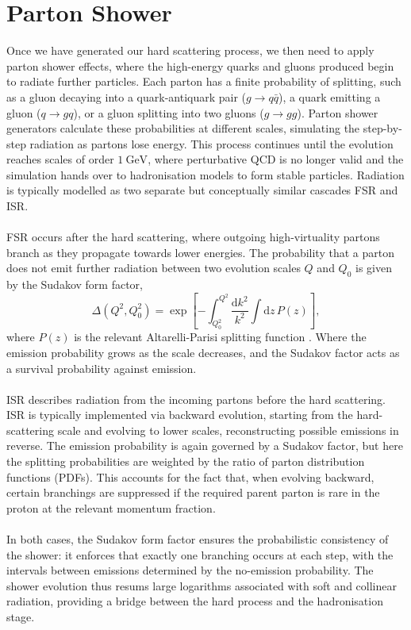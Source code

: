 \section{Parton Shower} \label{PS}
Once we have generated our hard scattering process, we then need to apply parton shower effects, where the high-energy quarks and gluons produced begin to radiate further particles. Each parton has a finite probability of splitting, such as a gluon decaying into a quark-antiquark pair ($g \to q\bar{q}$), a quark emitting a gluon ($q \to gq$), or a gluon splitting into two gluons ($g \to gg$). Parton shower generators calculate these probabilities at different scales, simulating the step-by-step radiation as partons lose energy. This process continues until the evolution reaches scales of order $1~\text{GeV}$, where perturbative QCD is no longer valid and the simulation hands over to hadronisation models to form stable particles. Radiation is typically modelled as two separate but conceptually similar cascades FSR and ISR.\\
\\
FSR occurs after the hard scattering, where outgoing high-virtuality partons branch as they propagate towards lower energies. The probability that a parton does not emit further radiation between two evolution scales $Q$ and $Q_0$ is given by the Sudakov form factor,
    \begin{equation}
        \Delta(Q^2, Q_0^2) = \exp \left[ - \int_{Q_0^2}^{Q^2} \frac{\mathrm{d}k^2}{k^2} \int \mathrm{d}z \, P(z) \right],
    \end{equation}
where $P(z)$ is the relevant Altarelli-Parisi splitting function \cite{Lonnblad2005PartonShowers}. Where the emission probability grows as the scale decreases, and the Sudakov factor acts as a survival probability against emission.\\
\\
ISR describes radiation from the incoming partons before the hard scattering. ISR is typically implemented via backward evolution, starting from the hard-scattering scale and evolving to lower scales, reconstructing possible emissions in reverse. The emission probability is again governed by a Sudakov factor, but here the splitting probabilities are weighted by the ratio of parton distribution functions (PDFs). This accounts for the fact that, when evolving backward, certain branchings are suppressed if the required parent parton is rare in the proton at the relevant momentum fraction.\\
\\
In both cases, the Sudakov form factor ensures the probabilistic consistency of the shower: it enforces that exactly one branching occurs at each step, with the intervals between emissions determined by the no-emission probability. The shower evolution thus resums large logarithms associated with soft and collinear radiation, providing a bridge between the hard process and the hadronisation stage.


